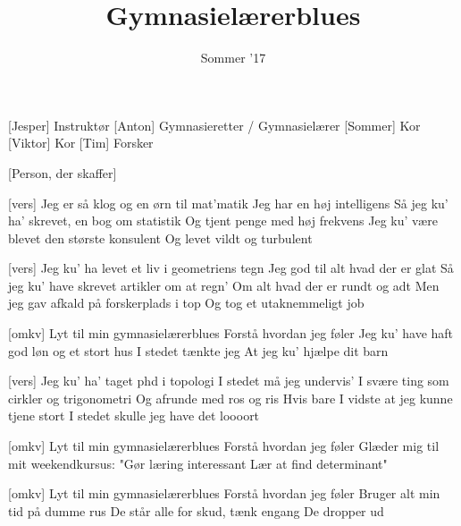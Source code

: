 \documentclass[a4paper,11pt]{article}
\title{Gymnasielærerblues}
\author{Sommer '17}
\begin{document}
\maketitle

\begin{roles}
[Jesper] Instruktør
[Anton] Gymnasieretter / Gymnasielærer
[Sommer] Kor
[Viktor] Kor
[Tim] Forsker
\end{roles}

\begin{props}
[Person, der skaffer]
\end{props}


\begin{song}

[vers]%
Jeg er så klog og en ørn til mat'matik
Jeg har en høj intelligens
Så jeg ku' ha' skrevet, en bog om statistik
Og tjent penge med høj frekvens
Jeg ku' være blevet den største konsulent
Og levet vildt og turbulent

[vers]%
Jeg ku' ha levet et liv i geometriens tegn
Jeg god til alt hvad der er glat
Så jeg ku' have skrevet artikler om at regn'
Om alt hvad der er rundt og adt
Men jeg gav afkald på forskerplads i top
Og tog et utaknemmeligt job

[omkv]%
Lyt til min gymnasielærerblues
Forstå hvordan jeg føler
Jeg ku' have haft god løn og et stort hus
I stedet tænkte jeg
At jeg ku' hjælpe dit barn

[vers]%
Jeg ku' ha' taget phd i topologi
I stedet må jeg undervis'
I svære ting som cirkler og trigonometri
Og afrunde med ros og ris
Hvis bare I vidste at jeg kunne tjene stort
I stedet skulle jeg have det loooort

[omkv]%
Lyt til min gymnasielærerblues
Forstå hvordan jeg føler
Glæder mig til mit weekendkursus:
"Gør læring interessant
Lær at find determinant"

[omkv]%
Lyt til min gymnasielærerblues
Forstå hvordan jeg føler
Bruger alt min tid på dumme rus
De står alle for skud, tænk engang
De dropper ud

\end{song}
\end{document}
